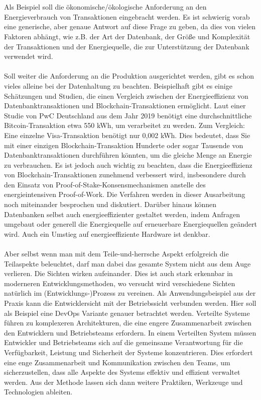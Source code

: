 \documentclass[../vs-script-first-v01.tex]{subfiles}
\begin{document}
\\\\
Als Beispiel soll die ökonomische/ökologische Anforderung an den Energieverbrauch von Transaktionen eingebracht werden. Es ist schwierig vorab eine generische, aber genaue Antwort auf diese Frage zu geben, da dies von vielen Faktoren abhängt, wie z.B. der Art der Datenbank, der Größe und Komplexität der Transaktionen und der Energiequelle, die zur Unterstützung der Datenbank verwendet wird.
\\\\
Soll weiter die Anforderung an die  Produktion ausgerichtet werden, gibt es schon vieles alleine bei der Datenhaltung zu beachten. Beispielhaft gibt es einige Schätzungen und Studien, die einen Vergleich zwischen der Energieeffizienz von Datenbanktransaktionen und Blockchain-Transaktionen ermöglicht. Laut einer Studie von PwC Deutschland aus dem Jahr 2019\cite{pwc2019} benötigt eine durchschnittliche Bitcoin-Transaktion etwa 550 kWh, um verarbeitet zu werden. Zum Vergleich: Eine einzelne Visa-Transaktion benötigt nur 0,002 kWh. Dies bedeutet, dass Sie mit einer einzigen Blockchain-Transaktion Hunderte oder sogar Tausende von Datenbanktransaktionen durchführen könnten, um die gleiche Menge an Energie zu verbrauchen.
Es ist jedoch auch wichtig zu beachten, dass die Energieeffizienz von Blockchain-Transaktionen zunehmend verbessert wird, insbesondere durch den Einsatz von Proof-of-Stake-Konsensmechanismen anstelle des energieintensiven Proof-of-Work. Die Verfahren werden in dieser Ausarbeitung noch miteinander besprochen und diskutiert. Darüber hinaus können Datenbanken selbst auch energieeffizienter gestaltet werden, indem Anfragen umgebaut oder generell die Energiequelle auf erneuerbare Energiequellen geändert wird. Auch ein Umstieg auf energieeffiziente Hardware ist denkbar. 
\\\\ 
Aber selbst wenn man mit dem Teile-und-herrsche Aspekt erfolgreich die Teilaspekte beleuchtet, darf man dabei das gesamte System nicht aus dem Auge verlieren. Die Sichten wirken aufeinander. Dies ist auch stark erkennbar in moderneren Entwicklungsmethoden, wo versucht wird verschiedene Sichten natürlich im (Entwicklungs-)Prozess zu vereinen. Als Anwendungsbeispiel aus der Praxis kann die Entwicklersicht mit der Betriebssicht verbunden werden. Hier soll als Beispiel eine DevOps\cite{kumar2016devops} Variante genauer betrachtet werden. 
Verteilte Systeme führen zu komplexeren Architekturen, die eine engere Zusammenarbeit zwischen den Entwicklern und Betriebsteams erfordern. In einem Verteilten System müssen Entwickler und Betriebsteams sich auf die gemeinsame Verantwortung für die Verfügbarkeit, Leistung und Sicherheit der Systeme konzentrieren. Dies erfordert eine enge Zusammenarbeit und Kommunikation zwischen den Teams, um sicherzustellen, dass alle Aspekte des Systems effektiv und effizient verwaltet werden. Aus der Methode lassen sich dann weitere Praktiken, Werkzeuge und Technologien ableiten. 
\end{document}
